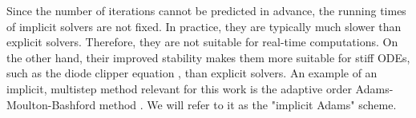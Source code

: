 Since the number of iterations cannot be predicted in advance, the running times of implicit solvers are not fixed. In practice, they are typically much slower than explicit solvers. Therefore, they are not suitable for real-time computations. On the other hand, their improved stability makes them more suitable for stiff \acp{ODE}, such as the diode clipper equation \cite{Parker2019}, than explicit solvers. An example of an implicit, multistep method relevant for this work is the adaptive order Adams-Moulton-Bashford method \cite{Karlsson2019}. We will refer to it as the "implicit Adams" scheme.
